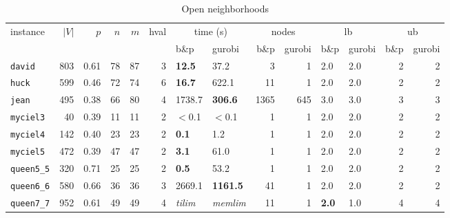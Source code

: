 \documentclass[preprint, 11pt, authoryear]{elsarticle}
\begin{document}
\begin{table}[]

\begin{subtable}{\textwidth}
\centering
\footnotesize
\setlength{\tabcolsep}{5pt}
\begin{tabular}{lrrrrrllrrllrr}
\toprule
instance & $|V|$ & $p$ & $n$ & $m$ & hval & \multicolumn{2}{c}{time (s)} & \multicolumn{2}{c}{nodes} & \multicolumn{2}{c}{lb} & \multicolumn{2}{c}{ub} \\
\cmidrule(lr){7-8} \cmidrule(lr){9-10} \cmidrule(lr){11-12} \cmidrule(lr){13-14}
 &  &  &  &  &  & b\&p & gurobi & b\&p & gurobi & b\&p & gurobi & b\&p & gurobi \\
\midrule
\texttt{david} & 803 & 0.61 & 78 & 87 & 3 & \textbf{12.5} & 37.2 & 3 & 1 & 2.0 & 2.0 & 2 & 2 \\
\texttt{huck} & 599 & 0.46 & 72 & 74 & 6 & \textbf{16.7} & 622.1 & 11 & 1 & 2.0 & 2.0 & 2 & 2 \\
\texttt{jean} & 495 & 0.38 & 66 & 80 & 4 & 1738.7 & \textbf{306.6} & 1365 & 645 & 3.0 & 3.0 & 3 & 3 \\
\texttt{myciel3} & 40 & 0.39 & 11 & 11 & 2 & $<$0.1 & $<$0.1 & 1 & 1 & 2.0 & 2.0 & 2 & 2 \\
\texttt{myciel4} & 142 & 0.40 & 23 & 23 & 2 & \textbf{0.1} & 1.2 & 1 & 1 & 2.0 & 2.0 & 2 & 2 \\
\texttt{myciel5} & 472 & 0.39 & 47 & 47 & 2 & \textbf{3.1} & 61.0 & 1 & 1 & 2.0 & 2.0 & 2 & 2 \\
\texttt{queen5\_5} & 320 & 0.71 & 25 & 25 & 2 & \textbf{0.5} & 53.2 & 1 & 1 & 2.0 & 2.0 & 2 & 2 \\
\texttt{queen6\_6} & 580 & 0.66 & 36 & 36 & 3 & 2669.1 & \textbf{1161.5} & 41 & 1 & 2.0 & 2.0 & 2 & 2 \\
\texttt{queen7\_7} & 952 & 0.61 & 49 & 49 & 4 & \textit{tilim} & \textit{memlim} & 11 & 1 & \textbf{2.0} & 1.0 & 4 & 4 \\
\bottomrule
\end{tabular}
\caption{Open neighborhoods}
\label{table.results.open.neighborhoods}
\end{subtable}

\medskip


\end{table}
\end{document}
